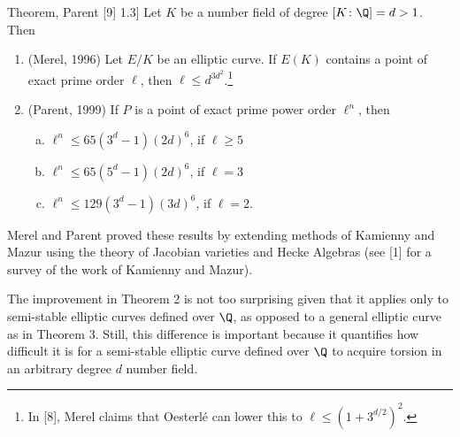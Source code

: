 \begin{thm}[3, Merel [8] Theorem, Parent [9] 1.3]
Let $K$ be a number field of degree $[K \colon \Q]= d > 1$. Then
	\begin{enumerate}[(1)]
	\item (Merel, 1996) Let $E/K$ be an elliptic curve. If $E(K)$ contains a point of exact prime order $\ell$, then $\ell \leq d^{3d^2}$.\footnote{In [8], Merel claims that Oesterl\'e can lower this to $\ell \leq (1 + 3^{d/2})^2$.}
	\item (Parent, 1999) If $P$ is a point of exact prime power order $\ell^n$, then
		\begin{enumerate}[(a)]
		\item $\ell^n \leq 65 (3^d - 1)(2d)^6$, if $\ell \geq 5$
		\item $\ell^n \leq 65(5^d - 1)(2d)^6$, if $\ell= 3$
		\item $\ell^n \leq 129(3^d - 1)(3d)^6$, if $\ell= 2$.
		\end{enumerate}
	\end{enumerate}
\end{thm}



Merel and Parent proved these results by extending methods of Kamienny and
Mazur using the theory of Jacobian varieties and Hecke Algebras (see [1] for a survey
of the work of Kamienny and Mazur).


The improvement in Theorem 2 is not too surprising given that it applies only
to semi-stable elliptic curves defined over $\Q$, as opposed to a general elliptic curve
as in Theorem 3. Still, this difference is important because it quantifies how difficult
it is for a semi-stable elliptic curve defined over $\Q$ to acquire torsion in an arbitrary
degree $d$ number field.


